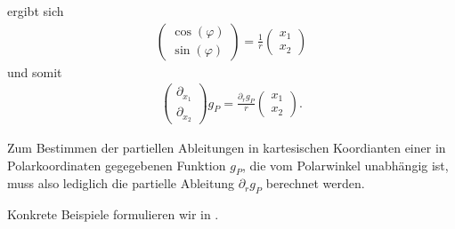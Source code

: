 ergibt sich 
\begin{align*}
  \begin{pmatrix}
    \cos(\varphi)\\
    \sin(\varphi)
  \end{pmatrix}
  = 
  \frac{1}{r}
  \begin{pmatrix}
    x_1\\
    x_2
  \end{pmatrix}
\end{align*}
und somit 
\begin{align*}
  \begin{pmatrix}
    \partial_{x_1}\\
    \partial_{x_2}
  \end{pmatrix}
  g_P
  = 
  \frac{\partial_r g_P}{r}
  \begin{pmatrix}
    x_1\\
    x_2
  \end{pmatrix}.
\end{align*} 

Zum Bestimmen der partiellen Ableitungen in kartesischen Koordianten einer
in Polarkoordinaten gegegebenen Funktion $g_P$, die
vom Polarwinkel unabhängig ist, muss also lediglich 
die partielle Ableitung $\partial_r g_P$ berechnet werden.

Konkrete Beispiele formulieren wir in .
